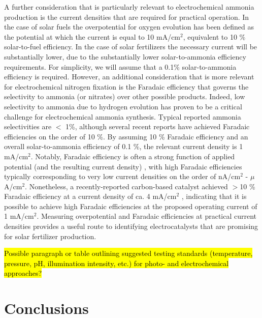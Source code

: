 A further consideration that is particularly relevant to electrochemical ammonia production is the current densities that are required for practical operation. In the case of solar fuels the overpotential for oxygen evolution has been defined as the potential at which the current is equal to 10 mA/cm$^2$, equivalent to 10 \% solar-to-fuel efficiency. In the case of solar fertilizers the necessary current will be substantially lower, due to the substantially lower solar-to-ammonia efficiency requirements. For simplicity, we will assume that a 0.1\% solar-to-ammonia efficiency is required. However, an additional consideration that is more relevant for electrochemical nitrogen fixation is the Faradaic efficiency that governs the selectivity to ammonia (or nitrates) over other possible products. Indeed, low selectivity to ammonia due to hydrogen evolution has proven to be a critical challenge for electrochemical ammonia synthesis.\cite{Singh_2017} Typical reported ammonia selectivities are $<$ 1\%, although several recent reports have achieved Faradaic efficiencies on the order of 10 \%. By assuming 10 \% Faradaic efficiency and an overall solar-to-ammonia efficiency of 0.1 \%, the relevant current density is 1 mA/cm$^2$. Notably, Faradaic efficiency is often a strong function of applied potential (and the resulting current density) \needcite, with high Faradaic efficiencies typically corresponding to very low current densities on the order of nA/cm$^2$ - $\mu$A/cm$^2$. Nonetheless, a recently-reported carbon-based catalyst achieved $>$10 \% Faradaic efficiency at a current density of ca. 4 mA/cm$^2$ \needcite, indicating that it is possible to achieve high Faradaic efficiencies at the proposed operating current of 1 mA/cm$^2$. Measuring overpotential and Faradaic efficiencies at practical current densities provides a useful route to identifying electrocatalysts that are promising for solar fertilizer production.

\hl{Possible paragraph or table outlining suggested testing standards (temperature, pressure, pH, illumination intensity, etc.) for photo- and electrochemical approaches?}



\section{Conclusions}

